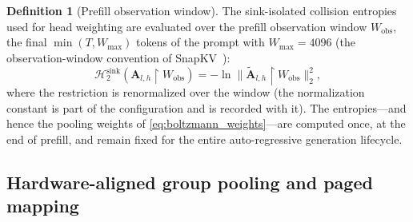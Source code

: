 \documentclass[final,5p,times,twocolumn]{elsarticle}
\theoremstyle{definition}
\newtheorem{definition}{Definition}
\theoremstyle{remark}
\newcommand{\Attn}[2]{\mathbf{A}_{#1,#2}}
\newcommand{\CollisionSink}[1]{\mathcal{H}^{\mathrm{sink}}_{2}\!\left(#1\right)}
\begin{document}
\begin{definition}[Prefill observation window]
\label{def:obswindow}
The sink-isolated collision entropies used for head weighting are
evaluated over the prefill observation window $W_{\mathrm{obs}}$, the
final $\min(T, W_{\max})$ tokens of the prompt with $W_{\max}=4096$ (the observation-window convention of SnapKV~\cite{li2024snapkv}):
\begin{equation}
\CollisionSink{\Attn{l}{h}\upharpoonright W_{\mathrm{obs}}}
= -\ln \bigl\| \tilde{\mathbf{A}}_{l,h} \upharpoonright
W_{\mathrm{obs}} \bigr\|_2^2,
\label{eq:window_entropy}
\end{equation}
where the restriction is renormalized over the window (the
normalization constant is part of the configuration and is recorded
with it). The entropies---and hence the pooling weights of
\cref{eq:boltzmann_weights}---are computed once, at the end of prefill,
and remain fixed for the entire auto-regressive generation lifecycle.
\end{definition}

\subsection{Hardware-aligned group pooling and paged mapping}
\label{subsec:pooling}
\end{document}
